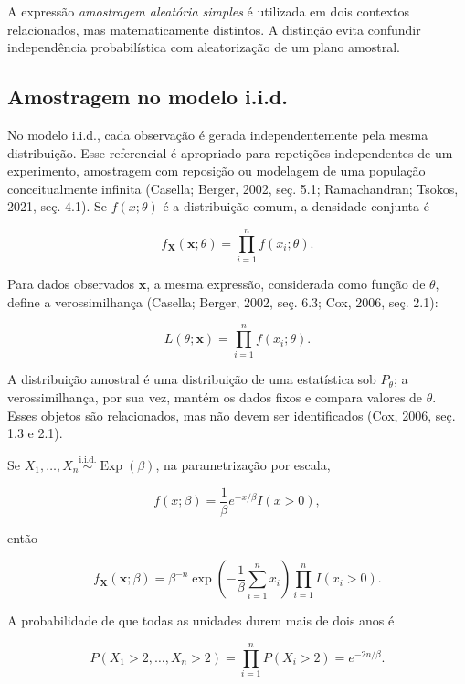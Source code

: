 \documentclass[
  letterpaper,
  DIV=11,
  numbers=noendperiod]{scrreprt}
\begin{document}
A expressão \emph{amostragem aleatória simples} é utilizada em dois
contextos relacionados, mas matematicamente distintos. A distinção evita
confundir independência probabilística com aleatorização de um plano
amostral.

\subsection{Amostragem no modelo
i.i.d.}\label{amostragem-no-modelo-i.i.d.}

No modelo i.i.d., cada observação é gerada independentemente pela mesma
distribuição. Esse referencial é apropriado para repetições
independentes de um experimento, amostragem com reposição ou modelagem
de uma população conceitualmente infinita (Casella; Berger, 2002, seç.
5.1; Ramachandran; Tsokos, 2021, seç. 4.1). Se \(f(x;\theta)\) é a
distribuição comum, a densidade conjunta é

\[f_{\mathbf{X}}(\mathbf{x};\theta)
=
\prod_{i=1}^n f(x_i;\theta).\]

Para dados observados \(\mathbf{x}\), a mesma expressão, considerada
como função de \(\theta\), define a verossimilhança (Casella; Berger,
2002, seç. 6.3; Cox, 2006, seç. 2.1):

\[L(\theta;\mathbf{x})
=
\prod_{i=1}^n f(x_i;\theta).\]

A distribuição amostral é uma distribuição de uma estatística sob
\(P_\theta\); a verossimilhança, por sua vez, mantém os dados fixos e
compara valores de \(\theta\). Esses objetos são relacionados, mas não
devem ser identificados (Cox, 2006, seç. 1.3 e 2.1).

\begin{tcolorbox}[enhanced jigsaw, colback=white, leftrule=.75mm, colbacktitle=quarto-callout-tip-color!10!white, breakable, titlerule=0mm, bottomtitle=1mm, title=\textcolor{quarto-callout-tip-color}{\faLightbulb}\hspace{0.5em}{Exemplo --- Tempos de vida exponenciais}, colframe=quarto-callout-tip-color-frame, toprule=.15mm, opacityback=0, bottomrule=.15mm, opacitybacktitle=0.6, arc=.35mm, toptitle=1mm, rightrule=.15mm, coltitle=black, left=2mm]

Se
\(X_1,\ldots,X_n\overset{\mathrm{i.i.d.}}{\sim}\operatorname{Exp}(\beta)\),
na parametrização por escala,

\[f(x;\beta)=\frac{1}{\beta}e^{-x/\beta}I(x>0),\]

então

\[f_{\mathbf{X}}(\mathbf{x};\beta)
=
\beta^{-n}\exp\left(-\frac{1}{\beta}\sum_{i=1}^n x_i\right)
\prod_{i=1}^n I(x_i>0).\]

A probabilidade de que todas as unidades durem mais de dois anos é

\[P(X_1>2,\ldots,X_n>2)
=
\prod_{i=1}^n P(X_i>2)
=
e^{-2n/\beta}.\]

\end{tcolorbox}
\end{document}
